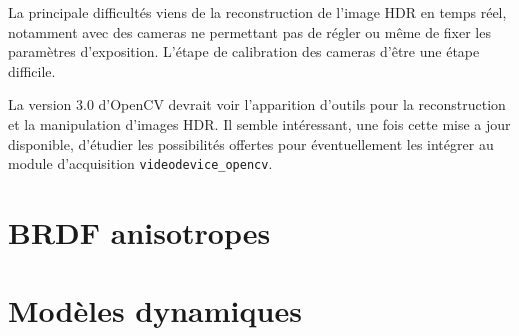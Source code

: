 \documentclass[10pt,a4paper,twoside, twocolumn]{report}
\newcommand*{\rootPath}{../}
\begin{document}
La principale difficultés viens de la reconstruction de l’image HDR en temps réel, notamment avec des cameras ne permettant pas de régler ou même de fixer les paramètres d’exposition. L’étape de calibration des cameras d’être une étape difficile. 

La version $3.0$ d’OpenCV devrait voir l’apparition d’outils pour la reconstruction et la manipulation d’images HDR. Il semble intéressant, une fois cette mise a jour disponible, d’étudier les possibilités offertes pour éventuellement les intégrer au module d’acquisition \texttt{videodevice\_opencv}.


\section{BRDF anisotropes}





\section{Modèles dynamiques}





\ifstandalone
	
	
\fi
\end{document}
